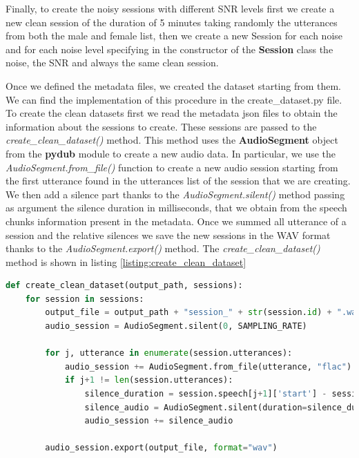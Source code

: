 \documentclass[../main.tex]{subfiles}
\begin{document}
Finally, to create the noisy sessions with different SNR levels first we create a new clean session of the duration of 5 minutes taking randomly the utterances from both the male and female list, then we create a new Session for each noise and for each noise level specifying in the constructor of the \textbf{Session} class the noise, the SNR and always the same clean session. 

Once we defined the metadata files, we created the dataset starting from them. We can find the implementation of this procedure in the create\_dataset.py file. To create the clean datasets first we read the metadata json files to obtain the information about the sessions to create. These sessions are passed to the \textit{create\_clean\_dataset()} method. This method uses the \textbf{AudioSegment} object from the \textbf{pydub} module to create a new audio data. In particular, we use the \textit{AudioSegment.from\_file()} function to create a new audio session starting from the first utterance found in the utterances list of the session that we are creating. We then add a silence part thanks to the \textit{AudioSegment.silent()} method passing as argument the silence duration in milliseconds, that we obtain from the speech chunks information present in the metadata. Once we summed all utterance of a session and the relative silences we save the new sessions in the WAV format thanks to the \textit{AudioSegment.export()} method. The \textit{create\_clean\_dataset()} method is shown in listing \ref{listing:create_clean_dataset}

\begin{lstlisting}[language=Python, caption={create\_clean\_dataset()}]
def create_clean_dataset(output_path, sessions):
    for session in sessions:
        output_file = output_path + "session_" + str(session.id) + ".wav"
        audio_session = AudioSegment.silent(0, SAMPLING_RATE)

        for j, utterance in enumerate(session.utterances):
            audio_session += AudioSegment.from_file(utterance, "flac")
            if j+1 != len(session.utterances):
                silence_duration = session.speech[j+1]['start'] - session.speech[j]['stop']
                silence_audio = AudioSegment.silent(duration=silence_duration * 1000, frame_rate=SAMPLING_RATE)
                audio_session += silence_audio
        
        audio_session.export(output_file, format="wav")
\end{lstlisting}
\label{listing:create_clean_dataset}
\end{document}
